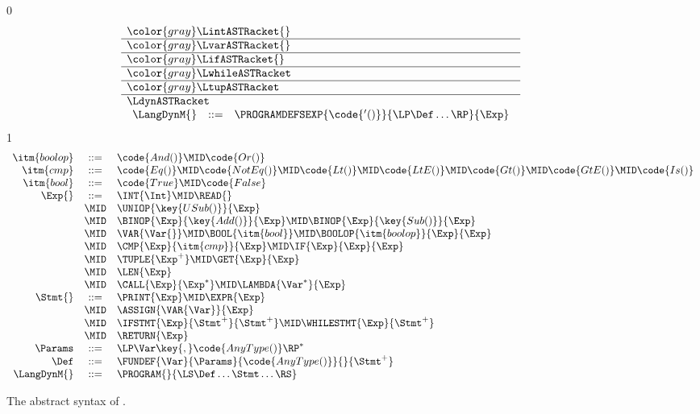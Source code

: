 \documentclass[7x10]{TimesAPriori_MIT}%
\newcommand{\gray}[1]{{\color{gray} #1}}
\def\racketEd{0}
\def\pythonEd{1}
\providecommand{\BookEdition}{1}
\let\edition\BookEdition
\newcommand{\pythonColor}[0]{}
\numberwithin{theorem}{chapter}
\numberwithin{definition}{chapter}
\numberwithin{equation}{chapter}
\begin{document}
\begin{figure}[tp]
\centering
\begin{tcolorbox}[colback=white]
    \small
{\if\edition\racketEd
\[
\begin{array}{l}
  \gray{\LintASTRacket{}} \\ \hline
  \gray{\LvarASTRacket{}} \\ \hline
  \gray{\LifASTRacket{}} \\ \hline
  \gray{\LwhileASTRacket} \\ \hline
  \gray{\LtupASTRacket} \\  \hline
\LdynASTRacket \\
\begin{array}{lcl}
  \LangDynM{} &::=& \PROGRAMDEFSEXP{\code{'()}}{\LP\Def\ldots\RP}{\Exp} 
\end{array}
\end{array}
\]
\fi}
{\if\edition\pythonEd\pythonColor
\[
\begin{array}{rcl}
\itm{boolop} &::=& \code{And()} \MID \code{Or()} \\
\itm{cmp} &::= & \code{Eq()} \MID \code{NotEq()} \MID \code{Lt()}
   \MID \code{LtE()} \MID \code{Gt()} \MID \code{GtE()} 
   \MID \code{Is()} \\
\itm{bool} &::=& \code{True} \MID \code{False} \\
\Exp{} &::=& \INT{\Int} \MID \READ{} \\
  &\MID& \UNIOP{\key{USub()}}{\Exp}\\
  &\MID&  \BINOP{\Exp}{\key{Add()}}{\Exp}  
    \MID  \BINOP{\Exp}{\key{Sub()}}{\Exp} \\
    &\MID& \VAR{\Var{}} 
  \MID \BOOL{\itm{bool}} 
     \MID \BOOLOP{\itm{boolop}}{\Exp}{\Exp}\\
  &\MID& \CMP{\Exp}{\itm{cmp}}{\Exp}  \MID \IF{\Exp}{\Exp}{\Exp} \\
  &\MID& \TUPLE{\Exp^{+}} \MID \GET{\Exp}{\Exp} \\
  &\MID& \LEN{\Exp} \\
  &\MID& \CALL{\Exp}{\Exp^{*}} \MID \LAMBDA{\Var^{*}}{\Exp} \\
\Stmt{} &::=& \PRINT{\Exp} \MID \EXPR{\Exp} \\
  &\MID& \ASSIGN{\VAR{\Var}}{\Exp}\\
  &\MID& \IFSTMT{\Exp}{\Stmt^{+}}{\Stmt^{+}} 
  \MID \WHILESTMT{\Exp}{\Stmt^{+}}\\
  &\MID& \RETURN{\Exp} \\
\Params &::=& \LP\Var\key{,}\code{AnyType()}\RP^*   \\
\Def &::=& \FUNDEF{\Var}{\Params}{\code{AnyType()}}{}{\Stmt^{+}}  \\
\LangDynM{} &::=& \PROGRAM{}{\LS \Def \ldots \Stmt \ldots \RS}
\end{array}
\]
\fi}
\end{tcolorbox}

\caption{The abstract syntax of \LangDyn{}.}
\label{fig:r7-syntax}
\end{figure}
\end{document}
